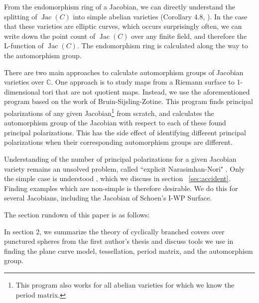 \documentclass[12pt,reqno]{amsart}
\DeclareMathOperator{\Jac}{Jac}
\newcommand{\C}{\mathbb{C}}
\newcommand{\n}{\newline}
\theoremstyle{definition}
\theoremstyle{remark}
\newcommand{\ti}{\todo[inline]}
\begin{document}
From the endomorphism ring of a Jacobian, we can directly understand the splitting of $\Jac(C)$ into simple abelian varieties (Corollary 4.8, \cite{jeroen}). In the case that these varieties are elliptic curves, which occurs surprisingly often, we can write down the point count of $\Jac(C)$ over any finite field, and therefore the L-function of $\Jac(C)$. The endomorphism ring is calculated along the way to the automorphism group.


There are two main approaches to calculate automorphism groups of Jacobian varieties over $\C$. One approach is to study maps from a Riemann surface to 1-dimensional tori that are not quotient maps. Instead, we use the aforementioned program based on the work of Bruin-Sijsling-Zotine. This program finds principal polarizations of any given Jacobian\footnote{This program also works for all abelian varieties for which we know the period matrix.} from scratch, and calculates the automorphism group of the Jacobian with respect to each of these found principal polarizations. This has the side effect of identifying different principal polarizations when their corresponding automorphism groups are different. 
    
Understanding of the number of principal polarizations for a given Jacobian variety remains an unsolved problem, called ``explicit Narasimhan-Nori" \cite{nn}. Only the simple case is understood \cite{several}, which we discuss in section ~\ref{sec:accident}. Finding examples which are non-simple is therefore desirable. We do this for several Jacobians, including the Jacobian of Schoen's I-WP Surface. 



$\text{}$\n The section rundown of this paper is as follows:

In section 2, we summarize the theory of cyclically branched covers over punctured spheres from the first author's thesis \cite{dthesis} and discuss tools we use in finding the plane curve model, tessellation, period matrix, and the automorphism group.
\end{document}
